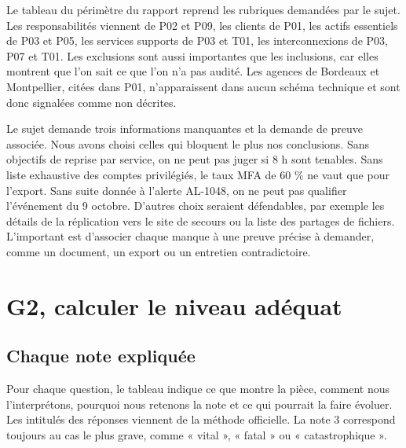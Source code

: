 \documentclass[11pt,a4paper]{article}
\begin{document}
Le tableau du périmètre du rapport reprend les rubriques demandées par le sujet. Les responsabilités viennent de P02 et P09, les clients de P01, les actifs essentiels de P03 et P05, les services supports de P03 et T01, les interconnexions de P03, P07 et T01. Les exclusions sont aussi importantes que les inclusions, car elles montrent que l'on sait ce que l'on n'a pas audité. Les agences de Bordeaux et Montpellier, citées dans P01, n'apparaissent dans aucun schéma technique et sont donc signalées comme non décrites.

Le sujet demande trois informations manquantes et la demande de preuve associée. Nous avons choisi celles qui bloquent le plus nos conclusions. Sans objectifs de reprise par service, on ne peut pas juger si 8 h sont tenables. Sans liste exhaustive des comptes privilégiés, le taux MFA de 60 \% ne vaut que pour l'export. Sans suite donnée à l'alerte AL-1048, on ne peut pas qualifier l'événement du 9 octobre. D'autres choix seraient défendables, par exemple les détails de la réplication vers le site de secours ou la liste des partages de fichiers. L'important est d'associer chaque manque à une preuve précise à demander, comme un document, un export ou un entretien contradictoire.

\section{G2, calculer le niveau adéquat}

\subsection{Chaque note expliquée}

Pour chaque question, le tableau indique ce que montre la pièce, comment nous l'interprétons, pourquoi nous retenons la note et ce qui pourrait la faire évoluer. Les intitulés des réponses viennent de la méthode officielle. La note 3 correspond toujours au cas le plus grave, comme « vital », « fatal » ou « catastrophique ».
\end{document}
